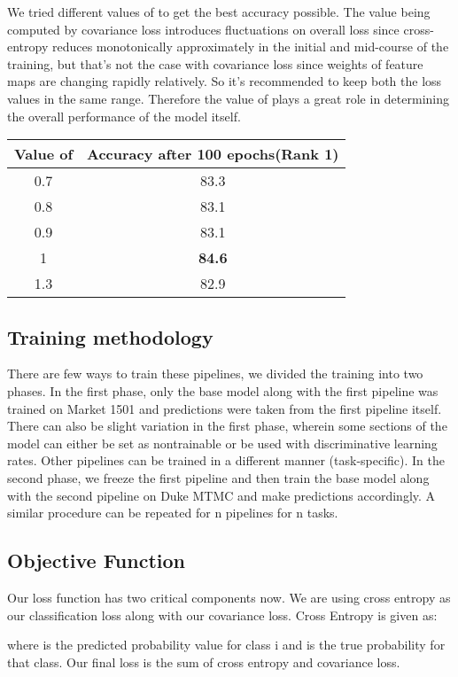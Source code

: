 \documentclass[10pt,twocolumn,letterpaper]{article}
\begin{document}
We tried different values of  to get the best accuracy possible. The value being computed by covariance loss introduces fluctuations on overall loss since cross-entropy reduces monotonically approximately in the initial and mid-course of the training, but that's not the case with covariance loss since weights of feature maps are changing rapidly relatively. So it's recommended to keep both the loss values in the same range. Therefore the value of  plays a great role in determining the overall performance of the model itself.
\begin{center}
 \begin{tabular}{||c c||} 
 \hline
 Value of  & Accuracy after 100 epochs(Rank 1) \\ [0.5ex] 
 \hline\hline
 0.7 & 83.3 \\ 
 \hline
 0.8 & 83.1 \\ 
 \hline
 0.9 & 83.1 \\ 
 \hline
 1 & \textbf{84.6} \\
 \hline
 1.3 & 82.9  \\ [1ex] 
 \hline
\end{tabular}
\end{center}

\subsection{Training methodology}
There are few ways to train these pipelines, we divided the training into two phases. In the first phase, only the base model along with the first pipeline was trained on Market 1501 and predictions were taken from the first pipeline itself. There can also be slight variation in the first phase, wherein some sections of the model can either be set as nontrainable or be used with discriminative learning rates. Other pipelines can be trained in a different manner (task-specific). In the second phase, we freeze the first pipeline and then train the base model along with the second pipeline on Duke MTMC and make predictions accordingly. A similar procedure can be repeated for n pipelines for n tasks.

\subsection{Objective Function}
Our loss function has two critical components now. We are using cross entropy as our classification loss along with our covariance loss. 
Cross Entropy is given as:

where  is the predicted probability value for class i and  is the true probability for that class.
Our final loss is the sum of cross entropy and covariance loss.
\end{document}
